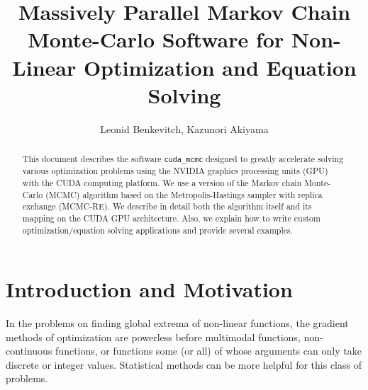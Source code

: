 \documentclass[preprint2]{aastex}
\begin{document}
\title{Massively Parallel Markov Chain Monte-Carlo Software for Non-Linear Optimization and Equation Solving}

\author{Leonid Benkevitch, Kazunori Akiyama}

\begin{abstract} \small 
This document describes the software \verb|cuda_mcmc| designed to greatly accelerate solving various optimization problems using the NVIDIA graphics processing units (GPU) with the CUDA computing platform. We use a version of the Markov chain Monte-Carlo (MCMC) algorithm based on the Metropolis-Hastings sampler with replica exchange (MCMC-RE). We describe in detail both the algorithm itself and its mapping on the CUDA GPU architecture. Also, we explain how to write custom optimization/equation solving applications and provide several examples. \\
\end{abstract}

\tableofcontents
\newpage


\section{Introduction and Motivation}\label{intro}


In the problems on finding global extrema of non-linear functions, the gradient methods of optimization are powerless before multimodal functions, non-continuous functions, or functions some (or all) of whose arguments can only take discrete or integer values. Statistical methods can be more helpful for this class of problems. 
\end{document}
